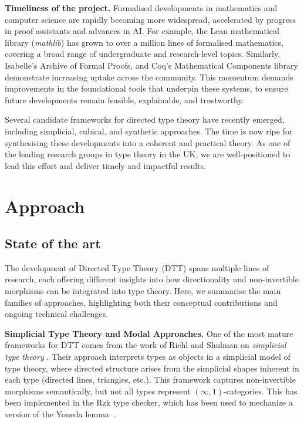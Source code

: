 \documentclass[a4paper,11pt]{article}
\renewcommand{\paragraph}[1]{\textbf{#1.}}
\begin{document}
\paragraph{Timeliness of the project}
%
%
Formalised developments in mathematics and computer science are
rapidly becoming more widespread, accelerated by progress in proof
assistants and advances in AI. For example, the Lean mathematical
library (\emph{mathlib}) has grown to over a million lines of
formalised mathematics, covering a broad range of undergraduate and
research-level topics. Similarly, 
Isabelle’s Archive of Formal Proofs, and Coq’s Mathematical Components
library demonstrate increasing uptake across the community. This
momentum demands improvements in the foundational tools that underpin
these systems, to ensure future developments remain feasible,
explainable, and trustworthy.

Several candidate frameworks for directed type theory have recently
emerged, including simplicial, cubical, and synthetic approaches. The
time is now ripe for synthesising these developments into a coherent
and practical theory. As one of the leading research groups in type
theory in the UK, we are well-positioned to lead this effort and
deliver timely and impactful results.

\section{Approach} %


\subsection{State of the art}\label{state-of-the-art}

The development of Directed Type Theory (DTT) spans multiple lines of
research, each offering different insights into how directionality and
non-invertible morphisms can be integrated into type theory. Here, we
summarise the main families of approaches, highlighting both their
conceptual contributions and ongoing technical challenges.

\paragraph{Simplicial Type Theory and Modal Approaches}
One of the most mature frameworks for DTT comes from the work
of Riehl and Shulman on \emph{simplicial type theory}
\cite{riehlshulman2017}. Their approach interprets types as objects in
a simplicial model of type theory, where directed structure arises
from the simplicial shapes inherent in each type (directed lines, triangles, etc.).
This framework captures non-invertible morphisms
semantically, but not all types represent $(\infty,1)$-categories.
This has been implemented in the Rzk type checker, which has been used to mechanize
a version of the Yoneda lemma~\cite{kudasov2024}.
\end{document}
